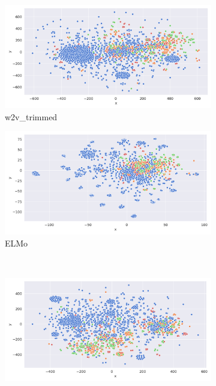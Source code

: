 \documentclass[11pt,a4paper]{article}
\begin{document}
\begin{figure}[t]
\begin{subfigure}{0.5\linewidth}
  \centering
  \includegraphics[width=\linewidth]{img/word2vec-embeddings.png}
  \caption{w2v\_trimmed}
  \label{fig:sfig1}
\end{subfigure}%
\begin{subfigure}{0.5\linewidth}
  \centering
  \includegraphics[width=\linewidth]{img/elmo-embeddings.png}
  \caption{ELMo}
  \label{fig:sfig2}
\end{subfigure}\\
\begin{subfigure}{0.5\linewidth}
  \centering
  \includegraphics[width=\linewidth]{img/bert-embeddings.png}

\end{subfigure}
\end{figure}
\end{document}
